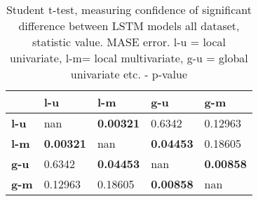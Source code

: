 \begin{table}[H]
\centering
\caption{Student t-test, measuring confidence of significant difference between LSTM models all dataset, statistic value. MASE error. l-u = local univariate, l-m= local multivariate, g-u = global univariate etc. - p-value}
\label{table:ttest-p-values-lstm-experiments-MASE-all-datasets}
\begin{tabular}{lllll}
\toprule
{} &               l-u &               l-m &               g-u &               g-m \\
\midrule
\textbf{l-u} &               nan &  \textbf{0.00321} &            0.6342 &           0.12963 \\
\textbf{l-m} &  \textbf{0.00321} &               nan &  \textbf{0.04453} &           0.18605 \\
\textbf{g-u} &            0.6342 &  \textbf{0.04453} &               nan &  \textbf{0.00858} \\
\textbf{g-m} &           0.12963 &           0.18605 &  \textbf{0.00858} &               nan \\
\bottomrule
\end{tabular}
\end{table}
